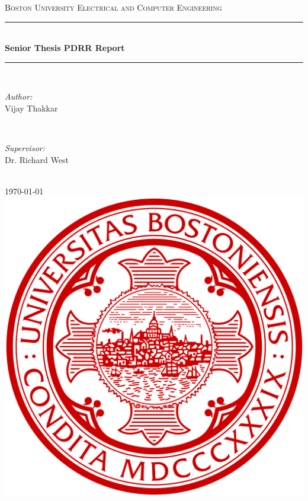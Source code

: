 \documentclass[12pt]{article}
\begin{document}
\begin{titlepage}
\begin{center}
\newcommand{\HRule}{\rule{\linewidth}{0.5mm}}
\textsc{\LARGE Boston University}
\linebreak
\textsc{\Large Electrical and Computer Engineering}\\[0.5cm]
\HRule \\[0.4cm]
{\huge \bfseries Senior Thesis PDRR Report}\\[0.4cm] %
\HRule \\[1.5cm]
 
\begin{minipage}{0.4\textwidth}
\begin{flushleft} \large
\emph{Author:}\\
Vijay Thakkar
\end{flushleft}
\end{minipage}
~
\begin{minipage}{0.4\textwidth}
\begin{flushright} \large
\emph{Supervisor:}\\
Dr. Richard West
\end{flushright}
\end{minipage}\\[2cm]

{\large \today}\\[2cm] 

\includegraphics[scale=0.15]{./../img/buseal.png}\\[1cm]
\vfill
\end{center}
\end{titlepage}
\end{document}
